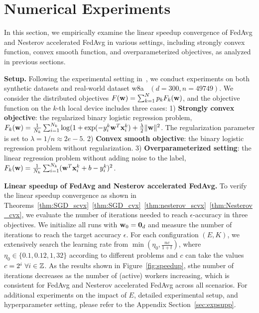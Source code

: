 \section{Numerical Experiments}
\label{sec:exp}

In this section, we empirically examine the linear speedup convergence of FedAvg and Nesterov accelerated FedAvg in various settings, including strongly convex function, convex smooth function, and overparameterized objectives, as analyzed in previous sections.

\textbf{Setup.} Following the experimental setting in~\cite{stich2018local}, we
conduct experiments on both synthetic datasets and real-world dataset
w8a~\cite{platt1998fast} $(d=300, n=49749)$. We consider the distributed
objectives $F({\mathbf{w}}) = \sum_{k=1}^N p_kF_k({\mathbf{w}})$, and the objective function on the
$k$-th local device includes three cases: 1) \textbf{Strongly convex
objective}: the regularized binary logistic regression problem, $F_k({\mathbf{w}}) =
\frac{1}{N_k} \sum_{i=1}^{N_k} \log( 1+ \exp(-y_i^k {\mathbf{w}}^T{\mathbf{x}}_i^k) + \frac{\lambda}{2}
\|{\mathbf{w}}\|^2$. The regularization parameter is set to $\lambda = 1/n \approx
2e-5$. 2) \textbf{Convex smooth objective}: the binary logistic regression
problem without regularization. 3) \textbf{Overparameterized setting}:
the linear regression problem without adding noise to the label, $F_k({\mathbf{w}}) =
\frac{1}{N_k} \sum_{i=1}^{N_k} ({\mathbf{w}}^T{\mathbf{x}}_i^k + b  - y_i^k)^2$.  

\textbf{Linear speedup of FedAvg and Nesterov accelerated FedAvg.} To verify the linear speedup convergence as shown in Theorems~\ref{thm:SGD_scvx}~\ref{thm:SGD_cvx}~\ref{thm:nesterov_scvx}~\ref{thm:Nesterov_cvx}, we evaluate the number of iterations needed to reach
$\epsilon$-accuracy in three objectives. We initialize all runs with ${\mathbf{w}}_0 = \textbf{0}_d$ and measure the number of iterations to reach the target accuracy $\epsilon$. For each configuration $(E, K)$, we extensively search the learning rate from $\min(\eta_0, \frac{nc}{1 + t})$, where
$\eta_0 \in \{0.1, 0.12, 1, 32 \}$ according to different problems and $c$ can
take the values $c = 2^i \ \forall i \in \mathbb{Z}$. As the results shown in Figure~\ref{fig:speedup},
sthe number of iterations decreases as the number of (active) workers increasing, which is consistent for FedAvg and Nesterov accelerated FedAvg across all scenarios.
For additional experiments on the impact of $E$, detailed experimental setup, and hyperparameter setting, please refer to the Appendix Section~\ref{sec:expsupp}.

